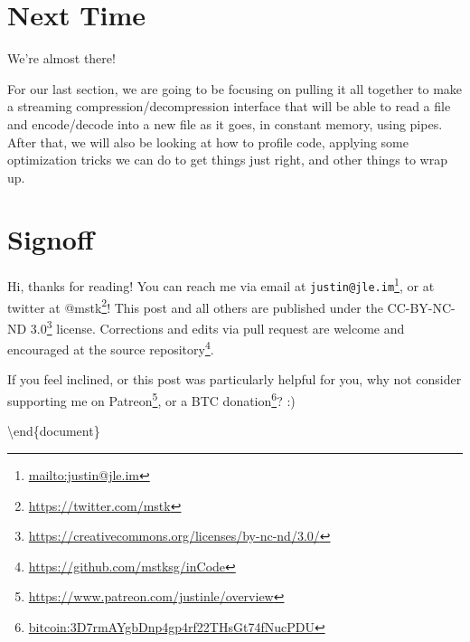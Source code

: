 \documentclass[]{article}
\renewcommand{\href}[2]{#2\footnote{\url{#1}}}
\begin{document}
\section{Next Time}\label{next-time}

We're almost there!

For our last section, we are going to be focusing on pulling it all together to
make a streaming compression/decompression interface that will be able to read a
file and encode/decode into a new file as it goes, in constant memory, using
pipes. After that, we will also be looking at how to profile code, applying some
optimization tricks we can do to get things just right, and other things to wrap
up.

\section{Signoff}\label{signoff}

Hi, thanks for reading! You can reach me via email at
\href{mailto:justin@jle.im}{\nolinkurl{justin@jle.im}}, or at twitter at
\href{https://twitter.com/mstk}{@mstk}! This post and all others are published
under the \href{https://creativecommons.org/licenses/by-nc-nd/3.0/}{CC-BY-NC-ND
3.0} license. Corrections and edits via pull request are welcome and encouraged
at \href{https://github.com/mstksg/inCode}{the source repository}.

If you feel inclined, or this post was particularly helpful for you, why not
consider \href{https://www.patreon.com/justinle/overview}{supporting me on
Patreon}, or a \href{bitcoin:3D7rmAYgbDnp4gp4rf22THsGt74fNucPDU}{BTC donation}?
:)

\textbackslash end\{document\}
\end{document}
